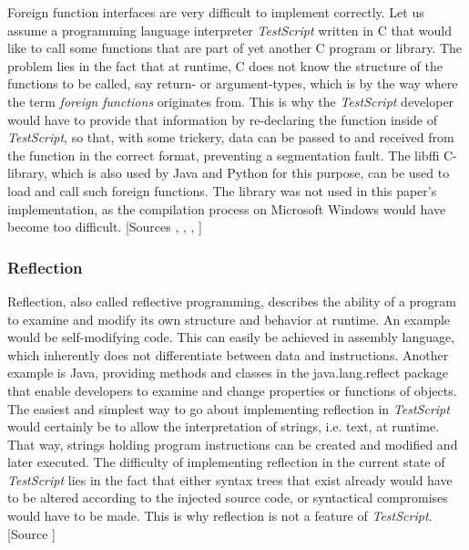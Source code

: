 \documentclass[12pt,a4paper]{article}
\newcommand{\name}{\emph{TestScript}}
\begin{document}
Foreign function interfaces are very difficult to implement correctly.
Let us assume a programming language interpreter \name{} written in C that
would like to call some functions that are part of yet another C program or
library. The problem lies in the fact that at runtime, C does not know the
structure of the functions to be called, say return- or argument-types, which
is by the way where the term \emph{foreign functions} originates from. This is why the
\name{} developer would have to provide that information by re-declaring the
function inside of \name{}, so that, with some trickery, data can be passed to and
received from the function in the correct format, preventing a segmentation
fault. The libffi C-library, which is also used by Java and
Python for this purpose, can be used to load and call such foreign functions.
The library was not used in this paper's implementation, as the compilation process
on Microsoft Windows would have become too difficult.
[Sources , , , ]

\subsubsection{Reflection}
Reflection, also called reflective programming, describes
the ability of a program to examine and modify its own structure and behavior 
at runtime. An example would be self-modifying code. This can easily be
achieved in assembly language, which inherently does not differentiate between
data and instructions.
Another example is Java, providing methods and classes in the java.lang.reflect
package that enable developers to examine and change properties or functions
of objects.
The easiest and simplest way to go about implementing reflection in \name{} would 
certainly be to allow the interpretation of strings, i.e. text, at runtime. That way, strings
holding program instructions can be created and modified and later executed.
The difficulty of implementing reflection in the current state of \name{} 
lies in the fact that either syntax trees that exist already would have to be 
altered according to the injected source code, or syntactical compromises would have to be made.
This is why reflection is not a feature of \name{}.
[Source ]
\end{document}
